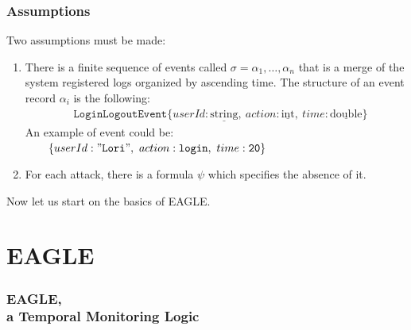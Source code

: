 \documentclass[aspectratio=169,t,xcolor=table]{beamer}
\begin{document}
\begin{frame}
    \frametitle{Assumptions}
    Two assumptions must be made:

    \vspace{5mm}
    \begin{enumerate}
        \item There is a finite sequence of events called $\sigma=\alpha_{1},\ldots ,\alpha_{n}$ that is a merge of the system registered logs organized by ascending time. 
        The structure of an event record $\alpha_i$ is the following:
        \begin{align*}
            & \mathtt{LoginLogoutEvent}\{userId:\underline{\text{string}},\ action: \underline{\text{int}},\ time: \underline{\text{double}}\} 
        \end{align*}
        An example of event could be:\\ $\quad\quad\{userId:\mathtt{"Lori"},\ action:\mathtt{login},\ time:\mathtt{20}\}$
        \item For each attack, there is a formula $\psi$ which specifies the absence of it.
    \end{enumerate}
    \vspace{5mm}
    Now let us start on the basics of EAGLE.
\end{frame}


\section{EAGLE}

\begin{frame}{}
    \frametitle{EAGLE,\\ a Temporal Monitoring Logic}
\end{frame}
\end{document}
